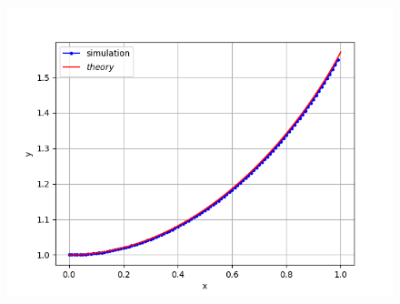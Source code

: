 \documentclass[journal]{IEEEtran}
\numberwithin{equation}{enumi}
\numberwithin{figure}{enumi}
\begin{document}
\begin{figure}[!ht]
    \centering
    \includegraphics[width=\columnwidth]{figs/Figure_1.png}
    \caption{}
\end{figure}
\end{document}
